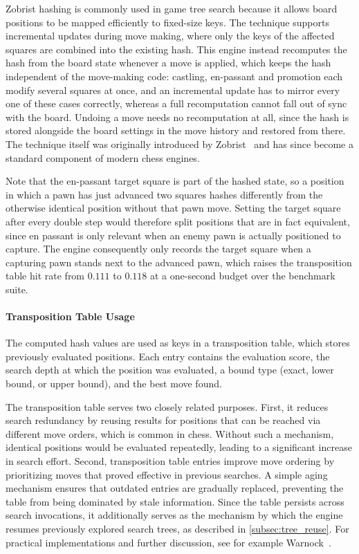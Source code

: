 Zobrist hashing is commonly used in game tree search because it allows board
positions to be mapped efficiently to fixed-size keys. The technique supports
incremental updates during move making, where only the keys of the affected
squares are combined into the existing hash. This engine instead recomputes the
hash from the board state whenever a move is applied, which keeps the hash
independent of the move-making code: castling, en-passant and promotion each
modify several squares at once, and an incremental update has to mirror every one
of these cases correctly, whereas a full recomputation cannot fall out of sync
with the board. Undoing a move needs no recomputation at all, since the hash is
stored alongside the board settings in the move history and restored from there.
The technique itself was originally introduced by
Zobrist~\cite{zobrist1970hashing} and has since become a standard component of
modern chess engines.

Note that the en-passant target square is part of the hashed state, so a position
in which a pawn has just advanced two squares hashes differently from the
otherwise identical position without that pawn move. Setting the target square
after every double step would therefore split positions that are in fact
equivalent, since en passant is only relevant when an enemy pawn is actually
positioned to capture. The engine consequently only records the target square
when a capturing pawn stands next to the advanced pawn, which raises the
transposition table hit rate from $0.111$ to $0.118$ at a one-second budget over
the benchmark suite.

\paragraph{Transposition Table Usage}
The computed hash values are used as keys in a transposition table, which stores
previously evaluated positions. Each entry contains the evaluation score, the
search depth at which the position was evaluated, a bound type (exact, lower
bound, or upper bound), and the best move found.

The transposition table serves two closely related purposes. First, it reduces
search redundancy by reusing results for positions that can be reached via
different move orders, which is common in chess. Without such a mechanism,
identical positions would be evaluated repeatedly, leading to a significant
increase in search effort. Second, transposition table entries improve move
ordering by prioritizing moves that proved effective in previous searches. A
simple aging mechanism ensures that outdated entries are gradually replaced,
preventing the table from being dominated by stale information. Since the table
persists across search invocations, it additionally serves as the mechanism by
which the engine resumes previously explored search trees, as described in
\cref{subsec:tree_reuse}. For practical
implementations and further discussion, see for example Warnock~\cite{warnock1988search}.

